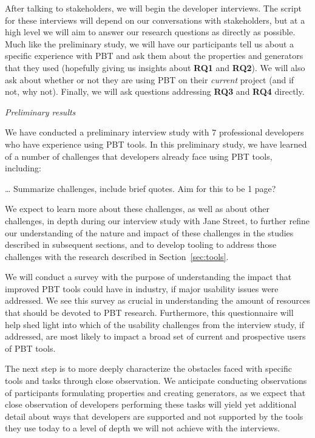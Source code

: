 After talking to stakeholders, we will begin the developer interviews. The
script for these interviews will depend on our conversations with stakeholders,
but at a high level we will aim to answer our research questions as directly as
possible. Much like the preliminary study, we will have our participants tell us about a
specific experience with PBT and ask them about the properties and generators
that they used (hopefully giving us insights about {\bf RQ1} and {\bf RQ2}).  We
will also ask about whether or not they are using PBT on their {\em current}
project (and if not, why not). Finally, we will ask questions addressing
{\bf RQ3} and {\bf RQ4} directly.

\textit{Preliminary results}

We have conducted a preliminary interview study with 7 professional developers
who have experience using PBT tools. In this preliminary study, we have learned
of a number of challenges that developers already face using PBT tools, including:

\ldots{} Summarize challenges, include brief quotes. Aim for this to be 1 page?

We expect to learn more about these challenges, as well as about other challenges,
in depth during our interview study with Jane Street, to further refine our
understanding of the nature and impact of these challenges in the studies
described in subsequent sections, and to develop tooling to address
those challenges with the research described in Section~\ref{sec:tools}.


We will conduct a survey with the purpose of understanding the impact that
improved PBT tools could have in industry, if major usability issues were
addressed. We see this survey as crucial in understanding the amount of
resources that should be devoted to PBT research. Furthermore, this
questionnaire will help shed light into which of the usability challenges from
the interview study, if addressed, are most likely to impact a broad set of
current and prospective users of PBT tools.


The next step is to more deeply characterize the obstacles faced with specific
tools and tasks through close observation. We anticipate conducting observations
of participants formulating properties and creating generators, as we expect
that close observation of developers performing these tasks will yield yet
additional detail about ways that developers are supported and not supported by
the tools they use today to a level of depth we will not achieve with the
interviews.

